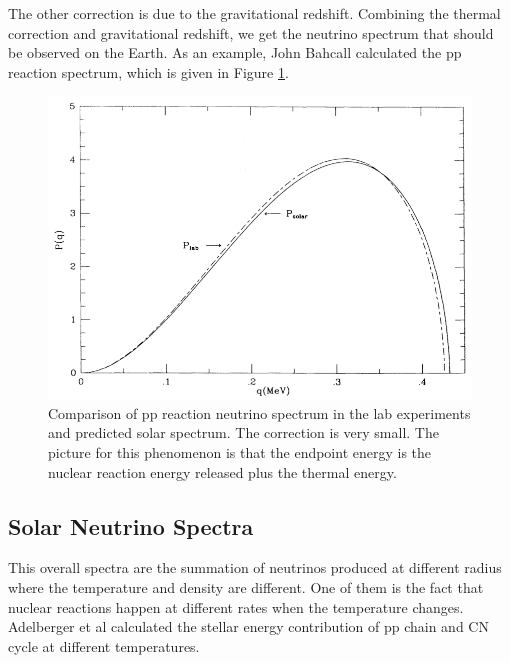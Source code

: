 \documentclass[%
 aip,
 jmp,%
 amsmath,amssymb,
 reprint,%
]{revtex4-1}
\begin{document}
The other correction is due to the gravitational redshift. Combining the thermal correction and gravitational redshift, we get the neutrino spectrum that should be observed on the Earth. As an example, John Bahcall calculated the pp reaction spectrum, which is given in Figure \ref{fig:bahcall_pp_nu_spectrum}.


\begin{figure}
\centering
\includegraphics[width=\columnwidth]{assets/bahcall_pp_nu_spectrum.png}
\caption{Comparison of pp reaction neutrino spectrum in the lab experiments and predicted solar spectrum.\cite{Bahcall1991} The correction is very small. The picture for this phenomenon is that the endpoint energy is the nuclear reaction energy released plus the thermal energy.}
\label{fig:bahcall_pp_nu_spectrum}
\end{figure}

\subsection{Solar Neutrino Spectra}


This overall spectra are the summation of neutrinos produced at different radius where the temperature and density are different. One of them is the fact that nuclear reactions happen at different rates when the temperature changes. Adelberger et al calculated the stellar energy contribution of pp chain and CN cycle at different temperatures.\cite{Adelberger2011a}
\end{document}
